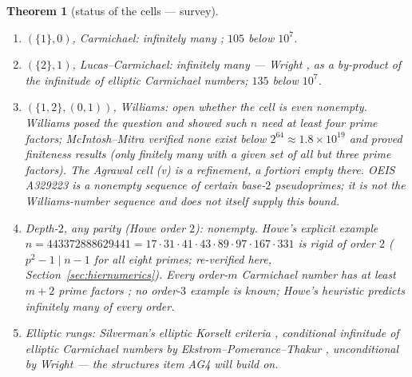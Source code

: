 \documentclass[11pt]{article}
\newtheorem{theorem}{Theorem}[section]
\theoremstyle{remark}
\begin{document}
\begin{theorem}[status of the cells --- survey]\label{thm:status}
\begin{enumerate}
\item[(a)] $(\{1\}, 0)$, Carmichael: infinitely many \cite{AGP}; $105$
below $10^7$.
\item[(b)] $(\{2\}, 1)$, Lucas--Carmichael: infinitely many --- Wright
\cite{Wright18}, as a by-product of the infinitude of elliptic Carmichael
numbers; $135$ below $10^7$.
\item[(c)] $(\{1,2\}, (0,1))$, Williams: open whether the cell is even
nonempty. Williams \cite{Williams77} posed the question and showed such
$n$ need at least four prime factors; McIntosh--Mitra \cite{McIntoshMitra}
verified none exist below $2^{64} \approx 1.8\times10^{19}$ and proved
finiteness results (only finitely many with a given set of all but three
prime factors). The Agrawal cell (v) is a refinement, a fortiori empty
there. OEIS A329223 is a nonempty sequence of certain base-$2$ pseudoprimes;
it is not the Williams-number sequence and does not itself supply this bound.
\item[(d)] Depth-$2$, any parity (Howe order $2$): \emph{nonempty}. Howe's
explicit example $n = 443372888629441 = 17\cdot31\cdot41\cdot43\cdot89
\cdot97\cdot167\cdot331$ is rigid of order $2$ ($p^2 - 1 \mid n - 1$ for
all eight primes; re-verified here, Section~\ref{sec:hiernumerics}). Every
order-$m$ Carmichael number has at least $m + 2$ prime factors
\cite{EterevskyVsemirnov}; no order-$3$ example is known; Howe's heuristic
predicts infinitely many of every order.
\item[(e)] Elliptic rungs: Silverman's elliptic Korselt criteria
\cite{Silverman12}, conditional infinitude of elliptic Carmichael numbers
by Ekstrom--Pomerance--Thakur \cite{EPT}, unconditional by Wright
\cite{Wright18} --- the structures item AG4 will build on.
\end{enumerate}
\end{theorem}
\end{document}
